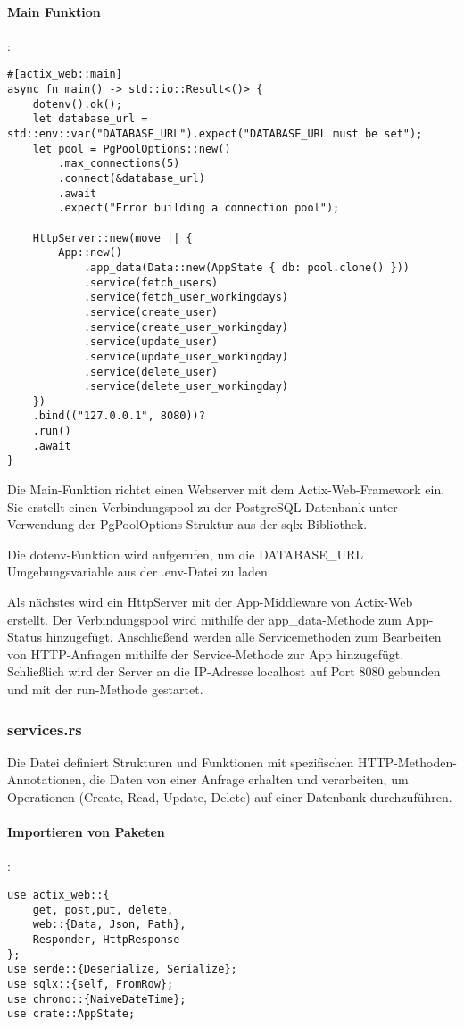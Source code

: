 \paragraph{Main Funktion}:
\begin{verbatim}
#[actix_web::main]
async fn main() -> std::io::Result<()> {
    dotenv().ok();
    let database_url = std::env::var("DATABASE_URL").expect("DATABASE_URL must be set");
    let pool = PgPoolOptions::new()
        .max_connections(5)
        .connect(&database_url)
        .await
        .expect("Error building a connection pool");

    HttpServer::new(move || {
        App::new()
            .app_data(Data::new(AppState { db: pool.clone() }))
            .service(fetch_users)
            .service(fetch_user_workingdays)
            .service(create_user)
            .service(create_user_workingday)
            .service(update_user)
            .service(update_user_workingday)
            .service(delete_user)
            .service(delete_user_workingday)
    })
    .bind(("127.0.0.1", 8080))?
    .run()
    .await
}
\end{verbatim}
Die Main-Funktion richtet einen Webserver mit dem Actix-Web-Framework ein. Sie erstellt einen Verbindungspool zu der PostgreSQL-Datenbank unter Verwendung der PgPoolOptions-Struktur aus der sqlx-Bibliothek. 

Die dotenv-Funktion wird aufgerufen, um die DATABASE\_URL Umgebungsvariable aus der .env-Datei zu laden.

Als nächstes wird ein HttpServer mit der App-Middleware von Actix-Web erstellt. Der Verbindungspool wird mithilfe der app\_data-Methode zum App-Status hinzugefügt. Anschließend werden alle Servicemethoden zum Bearbeiten von HTTP-Anfragen mithilfe der Service-Methode zur App hinzugefügt. Schließlich wird der Server an die IP-Adresse localhost auf Port 8080 gebunden und mit der run-Methode gestartet.

\subsubsection{services.rs}
Die Datei definiert Strukturen und Funktionen mit spezifischen HTTP-Methoden-Annotationen, die Daten von einer Anfrage erhalten und verarbeiten, um Operationen (Create, Read, Update, Delete) auf einer Datenbank durchzuführen. 

\paragraph{Importieren von Paketen}:
\begin{verbatim}
use actix_web::{
    get, post,put, delete,
    web::{Data, Json, Path},
    Responder, HttpResponse
};
use serde::{Deserialize, Serialize};
use sqlx::{self, FromRow};
use chrono::{NaiveDateTime};
use crate::AppState;
\end{verbatim}

